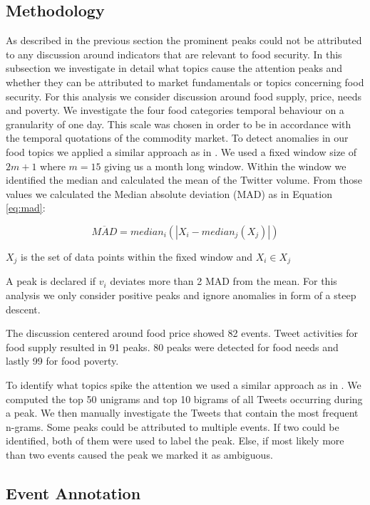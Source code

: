 \subsection{Methodology} 

As described in the previous section the prominent peaks could not be attributed to any discussion around indicators that are relevant to food security. In this subsection we investigate in detail what topics cause the attention peaks and whether they can be attributed to market fundamentals or topics concerning food security. For this analysis we consider discussion around food supply, price, needs and poverty. 
We investigate the four food categories temporal behaviour on a granularity of one day. This scale was chosen in order to be in accordance with the temporal quotations of the commodity market. 
To detect anomalies in our food topics we applied a similar approach as in \cite{olt15} \cite{Lehmann2012}. We used a fixed window size of $2m + 1$  where $m = 15$ giving us a month long window. Within the window we identified the median and calculated the mean of the Twitter volume. From those values we calculated the Median absolute deviation (MAD) as in Equation \ref{eq:mad}: 

\begin{equation} \label{eq:mad}
\overline{ MAD } = median_i (|X_i - median_j(X_j)|)\end{equation}


$X_j$ is the set of data points within the fixed window and $X_i \in X_j$

A peak is declared if $v_i$ deviates more than 2 MAD from the mean. For this analysis we only consider positive peaks and ignore anomalies in form of a steep descent. 

The discussion centered around food price showed 82 events. Tweet activities for food supply resulted in 91 peaks. 80 peaks were detected for food needs and lastly 99 for food poverty. 
 

To identify what topics spike the attention we used a similar approach as in \cite{olt15}. We computed the top 50 unigrams and top 10 bigrams of all Tweets occurring during a peak. We then manually investigate the Tweets that contain the most frequent n-grams. Some peaks could be attributed to multiple events. If two could be identified, both of them were used to label the peak. Else, if most likely more than two events caused the peak we marked it as ambiguous.  

\subsection{Event Annotation}

